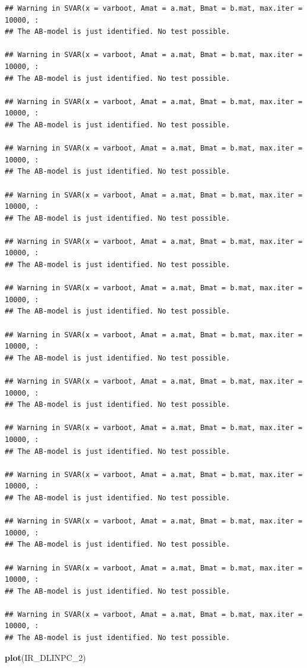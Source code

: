 \documentclass[
]{book}
\newenvironment{Shaded}{\begin{snugshade}}{\end{snugshade}}
\newcommand{\FunctionTok}[1]{\textcolor[rgb]{0.13,0.29,0.53}{\textbf{#1}}}
\newcommand{\NormalTok}[1]{#1}
\begin{document}
\begin{verbatim}
## Warning in SVAR(x = varboot, Amat = a.mat, Bmat = b.mat, max.iter = 10000, :
## The AB-model is just identified. No test possible.

## Warning in SVAR(x = varboot, Amat = a.mat, Bmat = b.mat, max.iter = 10000, :
## The AB-model is just identified. No test possible.

## Warning in SVAR(x = varboot, Amat = a.mat, Bmat = b.mat, max.iter = 10000, :
## The AB-model is just identified. No test possible.

## Warning in SVAR(x = varboot, Amat = a.mat, Bmat = b.mat, max.iter = 10000, :
## The AB-model is just identified. No test possible.

## Warning in SVAR(x = varboot, Amat = a.mat, Bmat = b.mat, max.iter = 10000, :
## The AB-model is just identified. No test possible.

## Warning in SVAR(x = varboot, Amat = a.mat, Bmat = b.mat, max.iter = 10000, :
## The AB-model is just identified. No test possible.

## Warning in SVAR(x = varboot, Amat = a.mat, Bmat = b.mat, max.iter = 10000, :
## The AB-model is just identified. No test possible.

## Warning in SVAR(x = varboot, Amat = a.mat, Bmat = b.mat, max.iter = 10000, :
## The AB-model is just identified. No test possible.

## Warning in SVAR(x = varboot, Amat = a.mat, Bmat = b.mat, max.iter = 10000, :
## The AB-model is just identified. No test possible.

## Warning in SVAR(x = varboot, Amat = a.mat, Bmat = b.mat, max.iter = 10000, :
## The AB-model is just identified. No test possible.

## Warning in SVAR(x = varboot, Amat = a.mat, Bmat = b.mat, max.iter = 10000, :
## The AB-model is just identified. No test possible.

## Warning in SVAR(x = varboot, Amat = a.mat, Bmat = b.mat, max.iter = 10000, :
## The AB-model is just identified. No test possible.

## Warning in SVAR(x = varboot, Amat = a.mat, Bmat = b.mat, max.iter = 10000, :
## The AB-model is just identified. No test possible.

## Warning in SVAR(x = varboot, Amat = a.mat, Bmat = b.mat, max.iter = 10000, :
## The AB-model is just identified. No test possible.
\end{verbatim}

\begin{Shaded}
\begin{Highlighting}[]
\FunctionTok{plot}\NormalTok{(IR\_DLINPC\_2)}
\end{Highlighting}
\end{Shaded}
\end{document}

